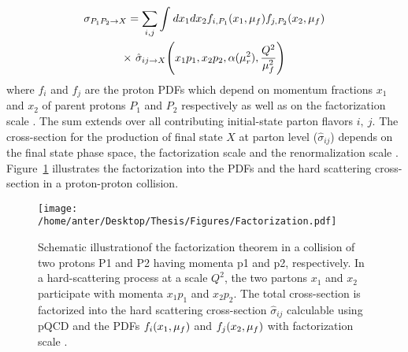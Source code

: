 \begin{equation}
\begin{gathered}
\sigma_{P_1P_2 \rightarrow X} = \sum\limits_{i,j}^{}\int_{}^{} dx_1dx_2f_{i,P_1}(x_1,\muf)f_{j,P_2}(x_2,\muf)\\\times~\hat\sigma_{ij\rightarrow X} \Bigg(x_1p_1,x_2p_2,\alpha(\mur^2),\frac{Q^2}{\muf^2}\Bigg)
\end{gathered}
\end{equation}
where $f_i$ and $f_{j}$ are the proton PDFs which depend on momentum fractions $x_1$ and $x_2$ of parent protons $P_1$ and $P_2$ respectively as well as on the factorization scale \muf. The sum extends over all contributing initial-state parton flavors $i,~j$. The cross-section for the production of final state $X$ at parton level ($\hat\sigma_{ij}$) depends on the final state phase space, the factorization scale \muf and the renormalization scale \mur. Figure~\ref{fig:fac} illustrates the factorization into the PDFs and the hard scattering cross-section in a proton-proton collision.
\begin{figure}[!h]
\begin{center}
\hspace*{-7mm}
\texttt{[image: /home/anter/Desktop/Thesis/Figures/Factorization.pdf]}\\
\vspace*{4mm}
\caption[Schematic illustration of the factorization theorem in a collision of two protons.]{Schematic illustration\footnotemark of the factorization theorem in a collision of two protons P1 and P2 having momenta p1 and p2, respectively. In a hard-scattering process at a scale $Q^2$, the two partons $x_1$ and $x_2$ participate with momenta $x_1p_1$ and $x_2p_2$. The total cross-section is factorized into the hard scattering cross-section $\hat\sigma_{ij}$ calculable using pQCD and the PDFs $f_i(x_1,\mu_f)$ and $f_j(x_2,\mu_f)$ with factorization scale \muf.}
\label{fig:fac}
\end{center}
\end{figure}

